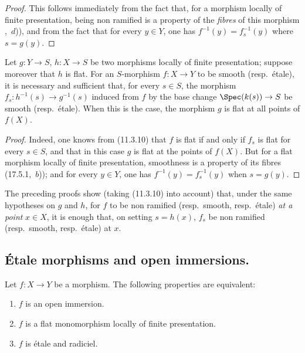 \begin{proof}
This follows immediately from the fact that, for a morphism locally of finite presentation, being non ramified is a property of the \emph{fibres} of this morphism ,~$d$)), and from the fact that for every $y\in Y$, one has $f^{-1}(y)=f_s^{-1}(y)$ where $s=g(y)$.
\end{proof}

\begin{proposition}[17.8.2]
\label{IV.17.8.2}
Let $g:Y\to S$, $h:X\to S$ be two morphisms locally of finite presentation; suppose moreover that $h$ is flat.
For an $S$-morphism $f:X\to Y$ to be smooth (resp.\ \'etale), it is necessary and sufficient that, for every $s\in S$, the morphism $f_s:h^{-1}(s)\to g^{-1}(s)$ induced from $f$ by the base change $\Spec(k(s))\to S$ be smooth (resp.\ \'etale).
When this is the case, the morphism $g$ is flat at all points of $f(X)$.
\end{proposition}

\begin{proof}
Indeed, one knows from (11.3.10) that $f$ is flat if and only if $f_s$ is flat for every $s\in S$, and that in this case $g$ is flat at the points of $f(X)$.
But for a flat morphism locally of finite presentation, smoothness is a property of its fibres (17.5.1,~$b$)); and for every $y\in Y$, one has $f^{-1}(y)=f_s^{-1}(y)$ when $s=g(y)$.
\end{proof}

\begin{remark}[17.8.3]
\label{IV.17.8.3}
The preceding proofs show (taking (11.3.10) into account) that, under the same hypotheses on $g$ and $h$, for $f$ to be non ramified (resp.\ smooth, resp.\ \'etale) \emph{at a point} $x\in X$, it is enough that, on setting $s=h(x)$, $f_s$ be non ramified (resp.\ smooth, resp.\ \'etale) at $x$.
\end{remark}


\subsection{\'Etale morphisms and open immersions.}
\label{subsection:IV.17.9}
\label{IV.17.9}

\begin{theorem}[17.9.1]
\label{IV.17.9.1}
Let $f:X\to Y$ be a morphism.
The following properties are equivalent:
\begin{enumerate}
  \item[a)] $f$ is an open immersion.
  \item[b)] $f$ is a flat monomorphism locally of finite presentation.
  \item[c)] $f$ is \'etale and radiciel.
\end{enumerate}
\end{theorem}

